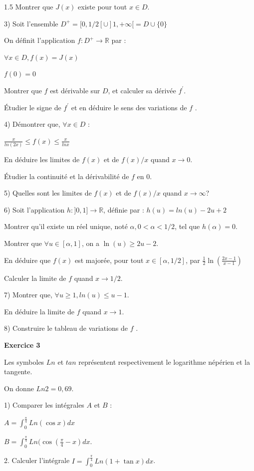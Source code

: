 \documentclass[12pt]{article}
\begin{document}
\begin{spacing}{1.5}
Montrer que $J(x)$ existe pour tout $x\in D$. 

3) Soit l'ensemble $D^+ = [0,1/2[\cup ]1,+\infty[ = D \cup \lbrace 0\rbrace$

On définit l'application $f : D^+\longrightarrow \mathbb{R}$ par : 

$\forall x \in D,f(x) = J(x)$

$f(0)=0$

Montrer que $f$ est dérivable sur $D$, et calculer sa dérivée $f^{\prime}$.

Étudier le signe de $f^{\prime}$ et en déduire le sens des variations de $f$ . 

4) Démontrer que, $\forall x \in D$ : 

$\frac{x}{ln(2x)}\leq f(x)\leq \frac{x}{lnx}$

En déduire les limites de $f(x)$ et de $f(x) /x$ quand $x \longrightarrow 0$. 

Étudier la continuité et la dérivabilité de $f$ en $0$. 

5) Quelles sont les limites de $f(x)$ et de $f(x)/x$ quand $x\longrightarrow \infty$? 

6) Soit l'application $h : ]0,1] \longrightarrow \mathbb{R}$, définie par : 
$h(u) = ln(u)-2u + 2$ 

Montrer qu'il existe un réel unique, noté $\alpha, 0 < \alpha  <1/2$, tel que $h(\alpha) = 0$. 

Montrer que $\forall u \in [\alpha, 1]$, on a $\ln(u)\geq 2u-2$. 

En déduire que $f(x)$ est majorée, pour tout $x\in[\alpha,1/2]$, par $\frac{1}{2}\ln\left(\frac{2x-1}{x-1}\right)$

Calculer la limite de $f$ quand  $x \longrightarrow 1/2$. 

7) Montrer que, $\forall u\geq 1, ln(u) \leq u - 1$. 

En déduire la limite de $f$ quand  $x \longrightarrow 1$. 

8) Construire le tableau de variations de $f$ . 

\medskip\textbf{Exercice 3}

Les symboles $Ln$ et $tan$ représentent respectivement le logarithme népérien et la tangente. 

On donne $Ln2 = 0,69$. 

1) Comparer les intégrales $A$ et $B$ :

$A=\int_{0}^{\frac{\pi}{4}}Ln(\cos x)dx$

$B= \int_{0}^{\frac{\pi}{4}}Ln(\cos(\frac{\pi}{4}- x)dx$.

2. Calculer l'intégrale $I=\int_{0}^{\frac{\pi}{4}}Ln(1+\tan x)dx$.

\end{spacing}
\end{document}
